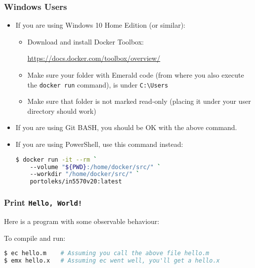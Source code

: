 \begin{frame}[fragile]

\frametitle{Windows Users}

\begin{itemize}

\item If you are using Windows 10 Home Edition (or similar):

\begin{itemize}

\item Download and install Docker Toolbox:

\url{https://docs.docker.com/toolbox/overview/}

\item Make sure your folder with Emerald code (from where you also
execute the \texttt{docker run} command), is under
\texttt{C:\textbackslash{}Users}

\item Make sure that folder is not marked read-only (placing it under
your user directory should work)

\end{itemize}

\item If you are using Git BASH, you should be OK with the above command.

\item If you are using PowerShell, use this command instead:

\vspace{-0.2in}

\begin{lstlisting}[language=bash]
$ docker run -it --rm `
    --volume "${PWD}:/home/docker/src/" `
    --workdir "/home/docker/src/" `
    portoleks/in5570v20:latest
\end{lstlisting}

\end{itemize}

\end{frame}

\begin{frame}[fragile]

\frametitle{Print \texttt{Hello, World!}}

Here is a program with some observable behaviour:


To compile and run:

\begin{lstlisting}[language=bash]
$ ec hello.m    # Assuming you call the above file hello.m
$ emx hello.x   # Assuming ec went well, you'll get a hello.x
\end{lstlisting}

\end{frame}


